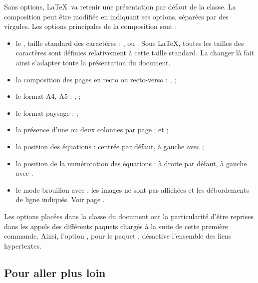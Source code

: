 Sans options, \LaTeX\ va retenir une présentation par défaut de la classe. La composition peut être modifiée en indiquant ses options, séparées par des virgules. Les options principales de la composition sont :
\begin{itemize}
\item le , taille standard des caractères : \macron{10pt}, \macron{11pt} ou \macron{12pt}. Sous \LaTeX, toutes les tailles des caractères sont définies relativement à cette taille standard. La changer là fait ainsi s'adapter toute la présentation du document.
\item la composition des pages en recto ou recto-verso : ,  ;
\item le format A4, A5 : ,  ;
\item le format paysage :  ;
\item la présence d'une ou deux colonnes par page :  et  ; 
\item la position des équations : centrée par défaut, à gauche avec  ; 
\item la position de la numérotation des équations : à droite par défaut, à gauche avec . 
\item le mode brouillon avec  : les images ne sont pas affichées et les débordements de ligne indiqués. Voir page \pageref{cesure}. \\
\end{itemize}

Les options placées dans la classe du document ont la particularité d'être reprises dans les appels des différents paquets chargés à la suite de cette première commande. Ainsi, l'option , pour le paquet , désactive l'ensemble des liens hypertextes.

\subsection{Pour aller plus loin}

